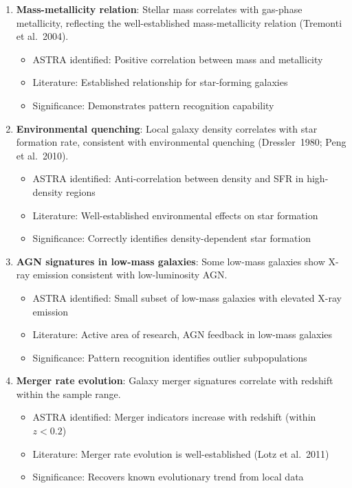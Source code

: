\documentclass[usenatbib]{rasti}
\begin{document}
\begin{enumerate}
\item \textbf{Mass-metallicity relation}: Stellar mass correlates with gas-phase metallicity, reflecting the well-established mass-metallicity relation (Tremonti et al.~2004)\cite{tremonti2004}.
   \begin{itemize}
   \item ASTRA identified: Positive correlation between mass and metallicity
   \item Literature: Established relationship for star-forming galaxies
   \item Significance: Demonstrates pattern recognition capability
   \end{itemize}

\item \textbf{Environmental quenching}: Local galaxy density correlates with star formation rate, consistent with environmental quenching (Dressler~1980; Peng et al.~2010)\cite{dressler1980,peng2010}.
   \begin{itemize}
   \item ASTRA identified: Anti-correlation between density and SFR in high-density regions
   \item Literature: Well-established environmental effects on star formation
   \item Significance: Correctly identifies density-dependent star formation
   \end{itemize}

\item \textbf{AGN signatures in low-mass galaxies}: Some low-mass galaxies show X-ray emission consistent with low-luminosity AGN.
   \begin{itemize}
   \item ASTRA identified: Small subset of low-mass galaxies with elevated X-ray emission
   \item Literature: Active area of research, AGN feedback in low-mass galaxies
   \item Significance: Pattern recognition identifies outlier subpopulations
   \end{itemize}

\item \textbf{Merger rate evolution}: Galaxy merger signatures correlate with redshift within the sample range.
   \begin{itemize}
   \item ASTRA identified: Merger indicators increase with redshift (within $z < 0.2$)
   \item Literature: Merger rate evolution is well-established (Lotz et al.~2011)
   \item Significance: Recovers known evolutionary trend from local data
   \end{itemize}


\end{enumerate}
\end{document}
